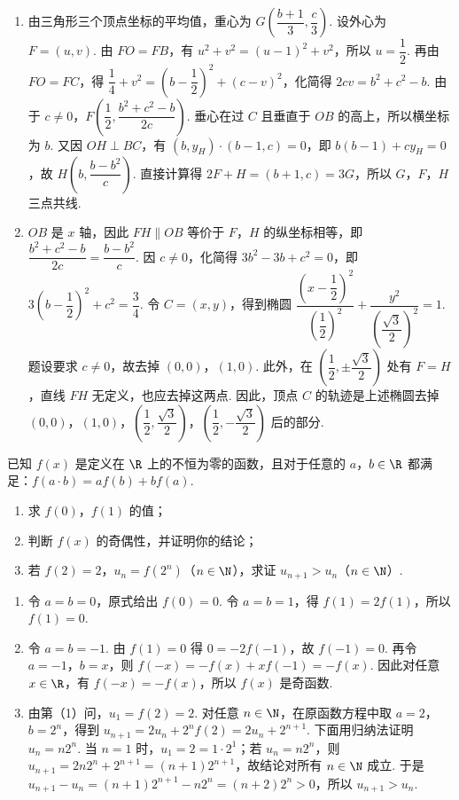 \begin{solution}
\begin{enumerate}
\item 由三角形三个顶点坐标的平均值，重心为 \(G\left(\dfrac{b+1}{3},\dfrac{c}{3}\right)\). 设外心为 \(F=(u,v)\). 由 \(FO=FB\)，有 \(u^2+v^2=(u-1)^2+v^2\)，所以 \(u=\dfrac{1}{2}\). 再由 \(FO=FC\)，得 \(\dfrac{1}{4}+v^2=\left(b-\dfrac{1}{2}\right)^2+(c-v)^2\)，化简得 \(2cv=b^2+c^2-b\). 由于 \(c\ne0\)，\(F\left(\dfrac{1}{2},\dfrac{b^2+c^2-b}{2c}\right)\). 垂心在过 \(C\) 且垂直于 \(OB\) 的高上，所以横坐标为 \(b\). 又因 \(OH\perp BC\)，有 \((b,y_H)\cdot(b-1,c)=0\)，即 \(b(b-1)+cy_H=0\)，故 \(H\left(b,\dfrac{b-b^2}{c}\right)\). 直接计算得 \(2F+H=(b+1,c)=3G\)，所以 \(G\)，\(F\)，\(H\) 三点共线.
\item \(OB\) 是 \(x\) 轴，因此 \(FH\parallel OB\) 等价于 \(F\)，\(H\) 的纵坐标相等，即 \(\dfrac{b^2+c^2-b}{2c}=\dfrac{b-b^2}{c}\). 因 \(c\ne0\)，化简得 \(3b^2-3b+c^2=0\)，即 \(3\left(b-\dfrac{1}{2}\right)^2+c^2=\dfrac{3}{4}\). 令 \(C=(x,y)\)，得到椭圆
\(\dfrac{\left(x-\dfrac{1}{2}\right)^2}{\left(\dfrac{1}{2}\right)^2}+\dfrac{y^2}{\left(\dfrac{\sqrt{3}}{2}\right)^2}=1\). 题设要求 \(c\ne0\)，故去掉 \((0,0)\)，\((1,0)\). 此外，在 \(\left(\dfrac{1}{2},\pm\dfrac{\sqrt{3}}{2}\right)\) 处有 \(F=H\)，直线 \(FH\) 无定义，也应去掉这两点. 因此，顶点 \(C\) 的轨迹是上述椭圆去掉 \((0,0)\)，\((1,0)\)，\(\left(\dfrac{1}{2},\dfrac{\sqrt{3}}{2}\right)\)，\(\left(\dfrac{1}{2},-\dfrac{\sqrt{3}}{2}\right)\) 后的部分.
\end{enumerate}
\end{solution}

\begin{problem}
已知 \(f(x)\) 是定义在 \(\R\) 上的不恒为零的函数，且对于任意的 \(a\)，\(b\in\R\) 都满足：\(f(a\cdot b)=af(b)+bf(a)\).

\begin{enumerate}
\item 求 \(f(0)\)，\(f(1)\) 的值；
\item 判断 \(f(x)\) 的奇偶性，并证明你的结论；
\item 若 \(f(2)=2\)，\(u_{n}=f(2^{n})\)（\(n\in\N\)），求证 \(u_{n+1}>u_{n}\)（\(n\in\N\)）.
\end{enumerate}
\end{problem}

\begin{solution}
\begin{enumerate}
\item 令 \(a=b=0\)，原式给出 \(f(0)=0\). 令 \(a=b=1\)，得 \(f(1)=2f(1)\)，所以 \(f(1)=0\).
\item 令 \(a=b=-1\). 由 \(f(1)=0\) 得 \(0=-2f(-1)\)，故 \(f(-1)=0\). 再令 \(a=-1\)，\(b=x\)，则 \(f(-x)=-f(x)+xf(-1)=-f(x)\). 因此对任意 \(x\in\R\)，有 \(f(-x)=-f(x)\)，所以 \(f(x)\) 是奇函数.
\item 由第（1）问，\(u_1=f(2)=2\). 对任意 \(n\in\N\)，在原函数方程中取 \(a=2\)，\(b=2^n\)，得到 \(u_{n+1}=2u_n+2^n f(2)=2u_n+2^{n+1}\). 下面用归纳法证明 \(u_n=n2^n\). 当 \(n=1\) 时，\(u_1=2=1\cdot2^1\)；若 \(u_n=n2^n\)，则 \(u_{n+1}=2n2^n+2^{n+1}=(n+1)2^{n+1}\)，故结论对所有 \(n\in\N\) 成立. 于是 \(u_{n+1}-u_n=(n+1)2^{n+1}-n2^n=(n+2)2^n>0\)，所以 \(u_{n+1}>u_n\).
\end{enumerate}
\end{solution}
